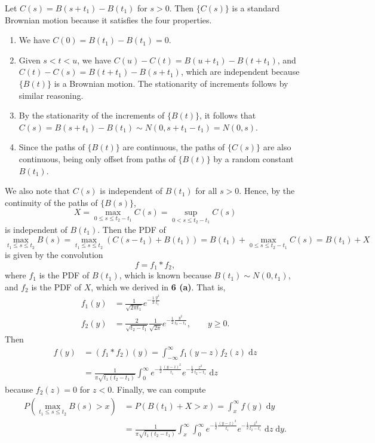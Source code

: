\documentclass{homework}
\begin{document}
	Let $C(s) = B(s+t_1) - B(t_1)$ for $s > 0$. Then $\{C(s)\}$ is a standard Brownian motion because it satisfies the four properties.
	\begin{enumerate}
		\item We have $C(0) = B(t_1) - B(t_1) = 0$.
		\item Given $s < t < u$, we have $C(u) - C(t) = B(u+t_1) - B(t+t_1)$, and $C(t) - C(s) = B(t+t_1) - B(s+t_1)$, which are independent because $\{B(t)\}$ is a Brownian motion. The stationarity of increments follows by similar reasoning.
		\item By the stationarity of the increments of $\{B(t)\}$, it follows that $C(s) = B(s+t_1) - B(t_1) \sim N(0,s+t_1-t_1) = N(0,s)$.
		\item Since the paths of $\{B(t)\}$ are continuous, the paths of $\{C(s)\}$ are also continuous, being only offset from paths of $\{B(t)\}$ by a random constant $B(t_1)$.
	\end{enumerate}
	We also note that $C(s)$ is independent of $B(t_1)$ for all $s>0$. Hence, by the continuity of the paths of $\{B(s)\}$,
	\begin{equation*}
		X = \max_{0\le s \le {t_2-t_1}}C(s) = \sup_{0 < s \le t_2-t_1}C(s)
	\end{equation*}
	is independent of $B(t_1)$. Then the PDF of 
	\begin{equation*}
		\max_{t_1\le s\le t_2} B(s) = \max_{t_1\le s\le t_2}(C(s-t_1) +B(t_1)) = B(t_1) + \max_{0\le s\le t_2-t_1}C(s) = B(t_1) + X
	\end{equation*}
	is given by the convolution
	\begin{equation*}
		f = f_1 * f_2,
	\end{equation*}
	where $f_1$ is the PDF of $B(t_1)$, which is known because $B(t_1)\sim N(0,t_1)$, and $f_2$ is the PDF of $X$, which we derived in \textbf{6 (a)}. That is,
	\begin{align*}
		f_1(y) &= \frac{1}{\sqrt{2\pi t_1}}e^{-\frac{1}{2}\frac{y^2}{t_1}} \\ 
		f_2(y) & =\frac{2}{\sqrt{t_2-t_1}}\frac{1}{\sqrt{2\pi}}e^{-\frac{1}{2}\frac{y^2}{t_2-t_1}}, \qquad y \ge0.
	\end{align*}
	Then
	\begin{align*}
		f(y) &= (f_1*f_2)(y) = \int_{-\infty}^\infty f_1(y-z)f_2(z)\;\text{d}z \\
		&=\frac{1}{\pi\sqrt{t_1(t_2-t_1)}}\int_{0}^\infty e^{-\frac{1}{2}\frac{(y-z)^2}{t_1}}e^{-\frac{1}{2}\frac{z^2}{t_2-t_1}}\;\text{d}z
	\end{align*}
	because $f_2(z) = 0$ for $z < 0$. Finally, we can compute
	\begin{align*}
		P\left(\max_{t_1\le s\le t_2}B(s) > x\right) &= P(B(t_1) + X > x) = \int_x^\infty f(y)\;\text{d}y \\
		&= \frac{1}{\pi\sqrt{t_1(t_2-t_1)}}\int_{x}^\infty\int_0^\infty e^{-\frac{1}{2}\frac{(y-z)^2}{t_1}}e^{-\frac{1}{2}\frac{z^2}{t_2-t_1}}\;\text{d}z\;\text{d}y.
	\end{align*}
	
\end{document}
